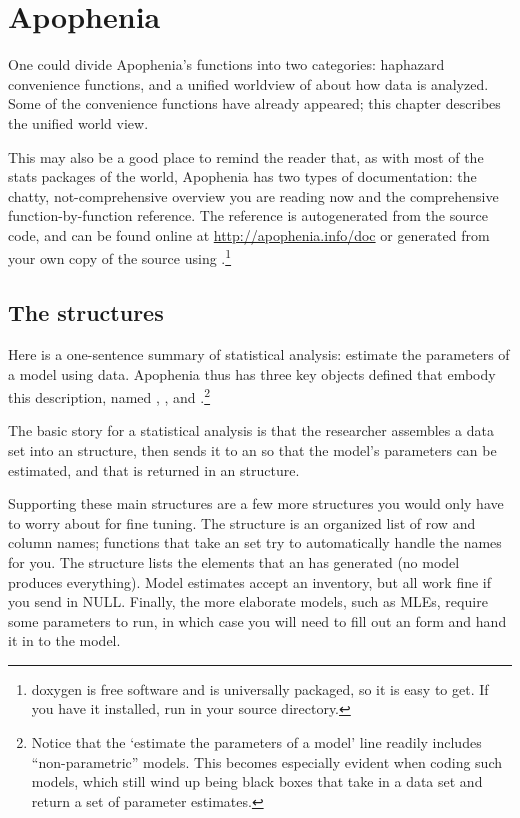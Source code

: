 \chapter{Apophenia} \label{apop}

One could divide Apophenia's functions into two categories: haphazard
convenience functions, and a unified worldview of about how data is
analyzed. Some of the convenience functions have already appeared; this
chapter describes the unified world view. 

This may also be a good place to remind the reader that, as with most of
the stats packages of the world, Apophenia has two types of
documentation: the chatty, not-comprehensive overview you are reading now and the
comprehensive function-by-function reference. The reference is autogenerated from the
source code, and can be found online at \url{http://apophenia.info/doc}
or generated from your own copy of the source using .\footnote{doxygen is free software and is universally packaged,
so it is easy to get. If you have it installed, run  in
your source directory.}

\section{The structures}
Here is a one-sentence summary of statistical analysis: estimate the
parameters of a model
using data. Apophenia thus has three key objects defined that embody
this description, named , , and 
.\footnote{Notice that the `estimate the parameters of a
model' line readily includes ``non-parametric'' models. This becomes
especially evident when coding such models, which still wind up being
black boxes that take in a data set and return a set of parameter
estimates.}

The basic story for a statistical analysis is that the researcher
assembles a data set into an  structure, then sends it to
an  so that the model's parameters can be estimated,
and that is returned in an  structure.

Supporting these main structures are a few more structures you would only
have to worry about for fine tuning.  The  structure is
an organized list of row and column names; functions that take an 
 set try to automatically handle the names for you.  The 
 structure lists the elements that an 
has generated (no model produces everything). Model estimates accept
an inventory, but all work fine if you send in NULL. Finally, the more
elaborate models, such as MLEs, require some parameters to run, in
which case you will need to fill out an 
form and hand it in to the model.



